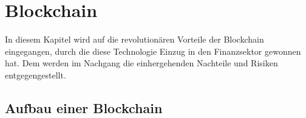 \section{Blockchain}
In diesem Kapitel wird auf die revolutionären Vorteile der Blockchain 
eingegangen, durch die diese Technologie Einzug in den Finanzsektor gewonnen 
hat. Dem werden im Nachgang die einhergehenden Nachteile und Risiken entgegengestellt. 

\subsection{Aufbau einer Blockchain}
\cite[p.~2]{pirafelnerblockchaintechnologie}

\subsection{}